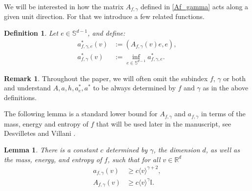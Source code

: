\documentclass[12pt,american]{amsart}
\numberwithin{equation}{section}
\theoremstyle{plain}
\newtheorem{lem}[thm]{Lemma}
\newtheorem{DEF}[thm]{Definition}
\theoremstyle{definition}                  %
\newtheorem{rem}[thm]{Remark}
\begin{document}
We will be interested in how the matrix $A_{f,\gamma}$ defined in \eqref{Af_gamma} acts along a given unit direction. For that we introduce a few related functions.

\begin{DEF}\label{def: the matrix A and its functions} Let $e\in\mathbb{S}^{d-1}$, and define:
  \begin{align*}
	a^*_{f,\gamma,e}(v) & := (A_{f,\gamma}(v)e,e),\\
	a^*_{f,\gamma}(v) & := \inf \limits_{e\in\mathbb{S}^{d-1}}a^*_{f,\gamma,e}.
  \end{align*}	  
  

\end{DEF}

\begin{rem} Throughout the paper, we will often omit the subindex $f$, $\gamma$ or both and understand $A, a, h,a^*_e,a^*$ to be always determined by $f$ and $\gamma$ as in the above definitions.

\end{rem}

The following lemma is a standard lower bound for $A_{f,\gamma}$ and $a_{f,\gamma}$ in terms of the mass, energy and entropy of $f$ that will be used later in the manuscript, see Desvilletes and Villani \cite{DesVil2000a}.
\begin{lem}\label{lem: A lower bound in terms of conserved quantities}
  There is a constant $c$ determined by $\gamma$, the dimension $d$, as well as the mass, energy, and entropy of $f$, such that for all $v\in \mathbb{R}^d$ 
  \begin{align*}
  a_{f,\gamma}(v) &\geq c \langle v\rangle^{\gamma+2}, \\
    A_{f,\gamma}(v) &\geq c \langle v\rangle^\gamma\mathbb{I}.	  
  \end{align*}	  

\end{lem}
\end{document}
